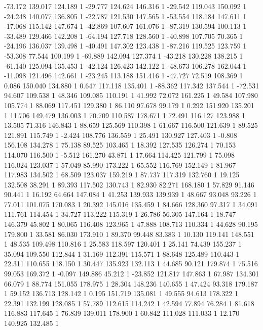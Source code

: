 	-73.172 139.017 124.189 1
	-29.777 124.624 146.316 1
	-29.542 119.043 150.092 1
	-24.248 140.077 136.805 1
	-22.787 121.530 147.565 1
	-53.554 118.184 147.611 1
	-17.068 115.142 147.674 1
	-42.869 107.607 161.076 1
	-87.319 130.594 100.113 1
	-33.489 129.466 142.208 1
	-64.194 127.718 128.560 1
	-40.898 107.705 70.365 1
	-24.196 136.037 139.498 1
	-40.491 147.302 123.438 1
	-87.216 119.525 123.759 1
	-53.308 77.544 100.199 1
	-69.889 142.094 127.374 1
	-43.218 130.228 138.215 1
	-61.140 125.094 135.453 1
	-42.124 126.423 142.122 1
	-48.673 106.278 162.044 1
	-11.098 121.496 142.661 1
	-23.245 113.188 151.416 1
	-47.727 72.519 108.369 1
	0.086 150.040 134.880 1
	0.647 117.118 135.401 1
	-88.362 117.342 137.544 1
	-72.531 94.607 109.538 1
	48.346 109.085 110.191 1
	41.992 72.072 161.225 1
	49.584 107.980 105.774 1
	88.069 117.451 129.380 1
	86.110 97.678 99.179 1
	0.292 151.920 135.201 1
	11.706 149.479 136.003 1
	70.709 110.587 178.671 1
	72.491 116.127 123.988 1
	13.505 71.316 146.843 1
	88.659 125.569 110.398 1
	61.667 116.500 121.639 1
	89.525 121.891 115.749 1
	-2.424 108.776 136.559 1
	25.491 130.927 127.403 1
	-0.808 156.108 134.278 1
	75.138 89.525 103.465 1
	18.392 127.535 126.274 1
	70.153 114.070 116.500 1
	-5.512 161.270 43.871 1
	17.664 114.425 121.799 1
	75.098 116.024 123.037 1
	57.049 85.990 173.222 1
	65.552 116.769 152.149 1
	81.967 117.983 134.502 1
	68.509 123.037 159.219 1
	87.737 117.319 132.760 1
	19.125 132.508 38.291 1
	89.393 117.502 130.743 1
	82.930 82.271 168.180 1
	57.829 91.146 90.441 1
	16.192 64.664 147.084 1
	41.253 139.933 139.939 1
	48.667 93.048 93.226 1
	77.011 101.075 170.083 1
	20.392 145.016 135.459 1
	84.666 128.360 97.317 1
	34.091 111.761 114.454 1
	34.727 113.222 115.319 1
	26.786 56.305 147.164 1
	18.747 146.379 45.802 1
	80.065 116.408 123.965 1
	47.888 108.713 110.334 1
	44.628 90.195 179.800 1
	33.581 86.030 173.910 1
	89.370 99.448 83.383 1
	10.130 119.141 148.551 1
	48.535 109.498 110.816 1
	25.583 118.597 120.401 1
	25.141 74.439 155.237 1
	35.094 109.550 112.844 1
	31.169 112.391 115.571 1
	88.648 125.489 110.443 1
	22.311 110.655 118.150 1
	30.447 135.923 132.113 1
	44.685 90.121 179.874 1
	75.516 99.053 169.372 1
	-0.097 149.886 45.212 1
	-23.852 121.817 147.863 1
	67.987 134.301 66.079 1
	88.774 151.055 178.975 1
	28.304 148.236 140.655 1
	47.424 93.318 179.187 1
	59.152 136.713 128.142 1
	0.195 151.719 135.081 1
	49.555 94.613 178.322 1
	22.391 132.199 128.085 1
	57.789 112.615 114.242 1
	42.594 77.894 76.284 1
	81.618 116.883 117.645 1
	76.839 139.011 178.900 1
	60.842 111.028 111.033 1
	12.170 140.925 132.485 1
